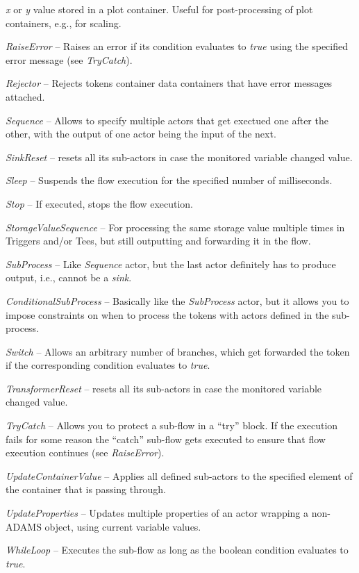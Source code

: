 \begin{tight_itemize}
	\textit{x} or \textit{y} value stored in a plot container. Useful for
	post-processing of plot containers, e.g., for scaling.
	\item \textit{RaiseError} -- Raises an error if its condition evaluates to
	\textit{true} using the specified error message (see \textit{TryCatch}).
	\item \textit{Rejector} -- Rejects tokens container data containers that have
	error messages attached.
	\item \textit{Sequence} -- Allows to specify multiple actors that get exectued
	one after the other, with the output of one actor being the input of the next.
	\item \textit{SinkReset} -- resets all its sub-actors in case the monitored
	variable changed value.
	\item \textit{Sleep} -- Suspends the flow execution for the specified number of
	milliseconds.
	\item \textit{Stop} -- If executed, stops the flow execution.
	\item \textit{StorageValueSequence} -- For processing the same storage value
	multiple times in Triggers and/or Tees, but still outputting and forwarding
	it in the flow.
	\item \textit{SubProcess} -- Like \textit{Sequence} actor, but the last actor
	definitely has to produce output, i.e., cannot be a \textit{sink}.
	\item \textit{ConditionalSubProcess} -- Basically like the \textit{SubProcess}
	actor, but it allows you to impose constraints on when to process the tokens
	with actors defined in the sub-process.
	\item \textit{Switch} -- Allows an arbitrary number of branches, which get
	forwarded the token if the corresponding condition evaluates to \textit{true}.
	\item \textit{TransformerReset} -- resets all its sub-actors in case the monitored
	variable changed value.
	\item \textit{TryCatch} -- Allows you to protect a sub-flow in a ``try''
	block. If the execution fails for some reason the ``catch'' sub-flow gets
	executed to ensure that flow execution continues (see \textit{RaiseError}).
	\item \textit{UpdateContainerValue} -- Applies all defined sub-actors to the
	specified element of the container that is passing through.
	\item \textit{UpdateProperties} -- Updates multiple properties of an actor
	wrapping a non-ADAMS object, using current variable values.
	\item \textit{WhileLoop} -- Executes the sub-flow as long as the boolean
	condition evaluates to \textit{true}.
\end{tight_itemize}

